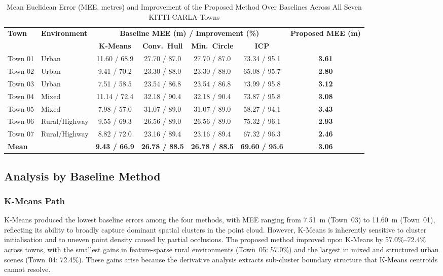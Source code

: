 \documentclass[lettersize,journal]{IEEEtran}
\begin{document}
\begin{table}[!t]
\caption{Mean Euclidean Error (MEE, metres) and Improvement of the Proposed
  Method Over Baselines Across All Seven KITTI-CARLA Towns
  \label{tab:results}}
\centering
\renewcommand{\arraystretch}{1.25}
\begin{tabular}{llccccc}
\toprule
\multirow{2}{*}{\textbf{Town}} &
\multirow{2}{*}{\textbf{Environment}} &
\multicolumn{4}{c}{\textbf{Baseline MEE (m) / Improvement (\%)}} &
\multirow{2}{*}{\textbf{Proposed MEE (m)}} \\
\cmidrule(lr){3-6}
& & \textbf{K-Means} & \textbf{Conv.\ Hull} & \textbf{Min.\ Circle} & \textbf{ICP} & \\
\midrule
Town 01 & Urban         & 11.60 / 68.9 & 27.70 / 87.0 & 27.70 / 87.0 & 73.34 / 95.1 & \textbf{3.61} \\
Town 02 & Urban         & 9.41  / 70.2 & 23.30 / 88.0 & 23.30 / 88.0 & 65.08 / 95.7 & \textbf{2.80} \\
Town 03 & Urban         & 7.51  / 58.5 & 23.54 / 86.8 & 23.54 / 86.8 & 73.99 / 95.8 & \textbf{3.12} \\
Town 04 & Mixed         & 11.14 / 72.4 & 32.18 / 90.4 & 32.18 / 90.4 & 73.87 / 95.8 & \textbf{3.08} \\
Town 05 & Mixed         & 7.98  / 57.0 & 31.07 / 89.0 & 31.07 / 89.0 & 58.27 / 94.1 & \textbf{3.43} \\
Town 06 & Rural/Highway & 9.55  / 69.3 & 26.56 / 89.0 & 26.56 / 89.0 & 75.32 / 96.1 & \textbf{2.93} \\
Town 07 & Rural/Highway & 8.82  / 72.0 & 23.16 / 89.4 & 23.16 / 89.4 & 67.32 / 96.3 & \textbf{2.46} \\
\midrule
\textbf{Mean} & & \textbf{9.43 / 66.9} & \textbf{26.78 / 88.5} & \textbf{26.78 / 88.5} & \textbf{69.60 / 95.6} & \textbf{3.06} \\
\bottomrule
\end{tabular}
\end{table}

\subsection{Analysis by Baseline Method}

\subsubsection{K-Means Path}
K-Means produced the lowest baseline errors among the four methods, with MEE
ranging from 7.51~m (Town~03) to 11.60~m (Town~01), reflecting its ability to
broadly capture dominant spatial clusters in the point cloud. However, K-Means
is inherently sensitive to cluster initialisation and to uneven point density
caused by partial occlusions. The proposed method improved upon K-Means by
57.0\%--72.4\% across towns, with the smallest gains in feature-sparse rural
environments (Town~05: 57.0\%) and the largest in mixed and structured urban
scenes (Town~04: 72.4\%). These gains arise because the derivative analysis
extracts sub-cluster boundary structure that K-Means centroids cannot resolve.
\end{document}

